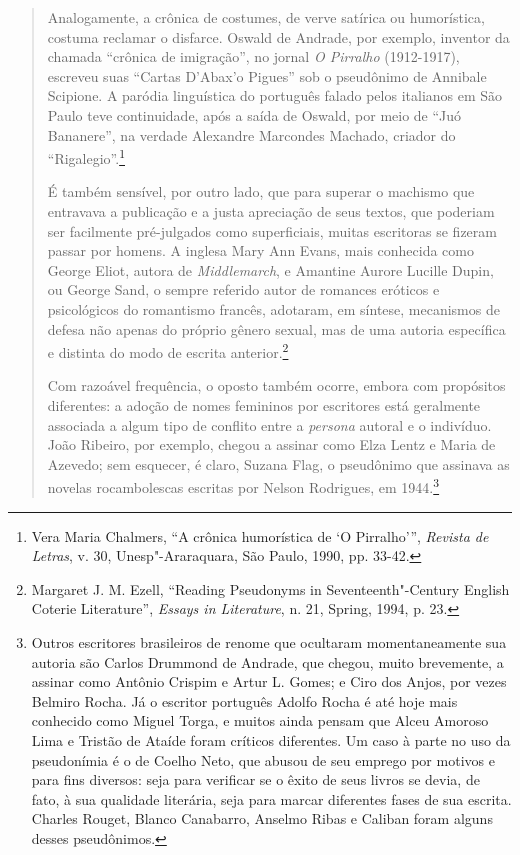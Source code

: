 \begin{quote}
Analogamente, a crônica de costumes, de verve satírica ou humorística,
costuma reclamar o disfarce. Oswald de Andrade, por exemplo, inventor da
chamada ``crônica de imigração'', no jornal \emph{O Pirralho}
(1912-1917), escreveu suas ``Cartas D'Abax'o Pigues'' sob o pseudônimo
de Annibale Scipione. A paródia linguística do português falado pelos
italianos em São Paulo teve continuidade, após a saída de Oswald, por
meio de ``Juó Bananere'', na verdade Alexandre Marcondes Machado,
criador do ``Rigalegio''.\footnote{Vera Maria Chalmers, ``A crônica
  humorística de `O Pirralho''', \emph{Revista de Letras}, v. 30,
  Unesp"-Araraquara, São Paulo, 1990, pp. 33-42.}

É também sensível, por outro lado, que para superar o machismo que
entravava a publicação e a justa apreciação de seus textos, que poderiam
ser facilmente pré-julgados como superficiais, muitas escritoras se
fizeram passar por homens. A inglesa Mary Ann Evans, mais conhecida como
George Eliot, autora de \emph{Middlemarch}, e Amantine Aurore Lucille
Dupin, ou George Sand, o sempre referido autor de romances eróticos e
psicológicos do romantismo francês, adotaram, em síntese, mecanismos de
defesa não apenas do próprio gênero sexual, mas de uma autoria
específica e distinta do modo de escrita anterior.\footnote{Margaret J.
  M. Ezell, ``Reading Pseudonyms in Seventeenth"-Century English Coterie
  Literature'', \emph{Essays in Literature}, n. 21, Spring, 1994, p. 23.}

Com razoável frequência, o oposto também ocorre, embora com propósitos
diferentes: a adoção de nomes femininos por escritores está geralmente
associada a algum tipo de conflito entre a \emph{persona} autoral e o
indivíduo. João Ribeiro, por exemplo, chegou a assinar como Elza Lentz e
Maria de Azevedo; sem esquecer, é claro, Suzana Flag, o pseudônimo que
assinava as novelas rocambolescas escritas por Nelson Rodrigues, em
1944.\footnote{Outros escritores brasileiros de renome que ocultaram
  momentaneamente sua autoria são Carlos Drummond de Andrade, que
  chegou, muito brevemente, a assinar como Antônio Crispim e Artur L.
  Gomes; e Ciro dos Anjos, por vezes Belmiro Rocha. Já o escritor
  português Adolfo Rocha é até hoje mais conhecido como Miguel Torga, e
  muitos ainda pensam que Alceu Amoroso Lima e Tristão de Ataíde foram
  críticos diferentes. Um caso à parte no uso da pseudonímia é o de
  Coelho Neto, que abusou de seu emprego por motivos e para fins
  diversos: seja para verificar se o êxito de seus livros se devia, de
  fato, à sua qualidade literária, seja para marcar diferentes fases de
  sua escrita. Charles Rouget, Blanco Canabarro, Anselmo Ribas e Caliban
  foram alguns desses pseudônimos.}


\end{quote}
